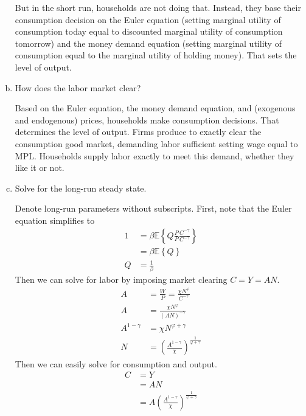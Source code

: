 \documentclass[answers]{exam}
\newcommand{\1}{\mathbf{1}}
\begin{document}
\begin{enumerate}[(a)]
\begin{solution}
        But in the short run, households are not doing that. Instead, they base their consumption decision on the Euler equation (setting marginal utility of consumption today equal to discounted marginal utility of consumption tomorrow) and the money demand equation (setting marginal utility of consumption equal to the marginal utility of holding money). That sets the level of output.
    \end{solution}
	\item How does the labor market clear?
	\begin{solution}
        Based on the Euler equation, the money demand equation, and (exogenous and endogenous) prices, households make consumption decisions. That determines the level of output. Firms produce to exactly clear the consumption good market, demanding labor sufficient setting wage equal to MPL. Households supply labor exactly to meet this demand, whether they like it or not.
    \end{solution}
	\item Solve for the long-run steady state.
	\begin{solution}
        Denote long-run parameters without subscripts. First, note that the Euler equation simplifies to
        \begin{align*}
            1&=\beta \mathbb{E}\left\{Q \frac{P}{P} \frac{C^{-\gamma}}{C^{-\gamma}}\right\} \\
            &=\beta \mathbb{E}\left\{Q\right\} \\
            Q & = \frac{1}{\beta}
        \end{align*}
        Then we can solve for labor by imposing market clearing $C = Y = AN$.
        \begin{align*}
            A & = \frac{W}{P} =\frac{\chi N^\varphi}{C^{-\gamma}} \\
            A & =\frac{\chi N^\varphi}{(AN)^{-\gamma}} \\
            A^{1 - \gamma} & = \chi N^{\varphi+\gamma} \\
            N & =\left(\frac{A^{1 - \gamma}}{\chi}\right)^{\frac{1}{\varphi + \gamma}}
        \end{align*}
        Then we can easily solve for consumption and output.
        \begin{align*}
            C & = Y \\
            & = AN \\
            & = A\left(\frac{A^{1 - \gamma}}{\chi}\right)^{\frac{1}{\varphi + \gamma}} \\

\end{align*}
\end{solution}
\end{enumerate}
\end{document}
